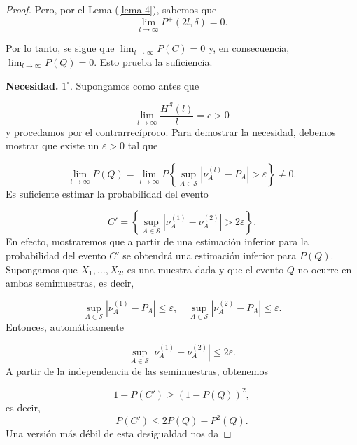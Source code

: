 \documentclass{report}
\begin{document}
\begin{proof}
Pero, por el Lema (\ref{lema 4}), sabemos que
\[ 
\lim_{l \to \infty} P^+(2l, \delta) = 0 .
\]

Por lo tanto, se sigue que \( \lim_{l \to \infty} P(C) = 0 \) y, en consecuencia, \( \lim_{l \to \infty} P(Q) = 0 \). Esto prueba la suficiencia.\newline

\textbf{Necesidad.}\newline
\( 1^\circ \). Supongamos como antes que

\begin{equation}\label{eq 23}
\lim_{l \to \infty} \frac{H^{\mathcal{S}}(l)}{l} = c > 0
\end{equation}
y procedamos por el contrarrecíproco. Para demostrar la necesidad, debemos mostrar que existe un \( \varepsilon > 0 \) tal que

\begin{equation*}
\lim_{l \to \infty} P(Q) = \lim_{l \to \infty} P \left\{ \sup_{A \in \mathcal{S}} \left| \nu_A^{(l)} - P_A \right| > \varepsilon \right\} \neq 0.
\end{equation*}
Es suficiente estimar la probabilidad del evento

\begin{equation*}
C' = \left\{ \sup_{A \in \mathcal{S}} \left| \nu_A^{(1)} - \nu_A^{(2)} \right| > 2\varepsilon \right\}.
\end{equation*}
En efecto, mostraremos que a partir de una estimación inferior para la probabilidad del evento \( C' \) se obtendrá una estimación inferior para \( P(Q) \). Supongamos que \( X_1, \dots, X_{2l} \) es una muestra dada y que el evento \( Q \) no ocurre en ambas semimuestras, es decir,

\begin{equation*}
\sup_{A \in \mathcal{S}} \left| \nu_A^{(1)} - P_A \right| \leq \varepsilon, \quad \sup_{A \in \mathcal{S}} \left| \nu_A^{(2)} - P_A \right| \leq \varepsilon.
\end{equation*}
Entonces, automáticamente

\begin{equation*}
\sup_{A \in \mathcal{S}} \left| \nu_A^{(1)} - \nu_A^{(2)} \right| \leq 2\varepsilon.
\end{equation*}
A partir de la independencia de las semimuestras, obtenemos

\begin{equation*}
1 - P(C') \geq (1 - P(Q))^2, 
\end{equation*}
es decir, 
\[
P(C') \leq 2P(Q) - P^2(Q).
\]
Una versión más débil de esta desigualdad nos da


\end{proof}
\end{document}
